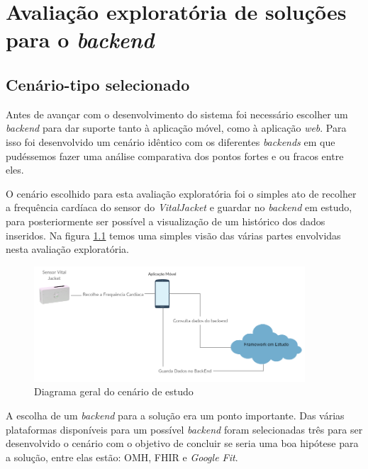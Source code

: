\chapter{Avaliação exploratória de soluções para o \textit{backend}}

\section{Cenário-tipo selecionado}

Antes de avançar com o desenvolvimento do sistema foi necessário escolher um \textit{backend} para dar suporte tanto à aplicação móvel, como à aplicação \textit{web}. Para isso foi desenvolvido um cenário idêntico com os diferentes \textit{backends} em que pudéssemos fazer uma análise comparativa dos pontos fortes e ou fracos entre eles. \par 
O cenário escolhido para esta avaliação exploratória foi o simples ato de recolher a frequência cardíaca do sensor do \textit{VitalJacket} e guardar no \textit{backend} em estudo, para posteriormente ser possível a visualização de um histórico dos dados inseridos. Na figura \ref{f:study-overview} temos uma simples visão das várias partes envolvidas nesta avaliação exploratória.

\begin{figure}[H]
  \centering
  \includegraphics[width=0.9\textwidth]{imgs/study-overview.png}
  \caption[Diagrama geral do cenário de estudo]{Diagrama geral do cenário de estudo}
  
  \label{f:study-overview}
\end{figure}

A escolha de um \textit{backend} para a solução era um ponto importante. Das várias plataformas disponíveis para um possível \textit{backend} foram selecionadas três para ser desenvolvido o cenário com o objetivo de concluir se seria uma boa hipótese para a solução, entre elas estão: \gls{OMH}, \gls{FHIR} e \textit{Google Fit}. \par

